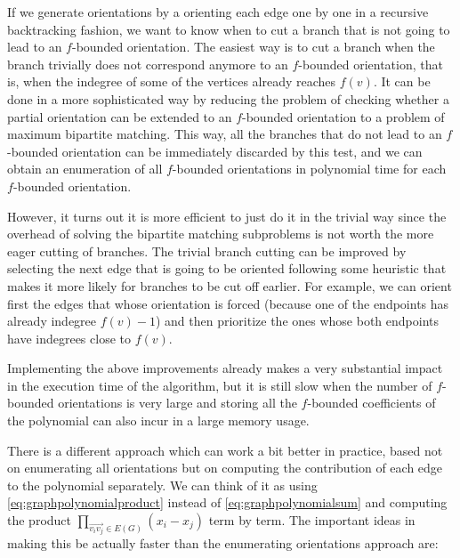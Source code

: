 If we generate orientations by a orienting each edge one by
one in a recursive backtracking fashion, we want to know when to cut a branch that is not going to lead
to an $f$-bounded orientation. The easiest way is to cut a branch when the 
branch trivially does not correspond
anymore to an $f$-bounded orientation, that is, 
when the indegree of some of the vertices already reaches $f(v)$. 
It can be done in a more sophisticated way by reducing the problem of checking whether a partial 
orientation can be extended to an $f$-bounded 
orientation to a problem of maximum bipartite matching. This way,
all the branches that do not lead to an $f$-bounded 
orientation can be immediately discarded by this test, and 
we can obtain an enumeration of all $f$-bounded orientations in polynomial time for each 
$f$-bounded orientation.

However, it turns out it is more efficient to just do it in the trivial way since the overhead of solving
the bipartite matching subproblems is not worth the more eager cutting of branches. The trivial branch cutting
can be improved by selecting the next edge that is going to be oriented following some heuristic
that makes it more likely for branches to be cut off earlier. 
For example, we can orient first the edges that whose orientation is forced 
(because one of the endpoints has already indegree $f(v)-1$) 
and then prioritize the ones whose both endpoints have indegrees close to $f(v)$.

Implementing the above improvements already makes a very substantial impact in the execution time
of the algorithm, but it is still slow when the number of $f$-bounded orientations is very large
and storing all the $f$-bounded coefficients of the polynomial can also incur in a large memory usage.

There is a different approach which can work a bit better in practice, based not on enumerating
all orientations but on computing the contribution of each edge to the polynomial separately. 
We can think of it as using \eqref{eq:graphpolynomialproduct} instead of \eqref{eq:graphpolynomialsum} and
computing the product $\prod_{\overrightarrow{v_iv_j} \in E(G)} (x_i - x_j)$ term by term.
The important ideas in making this be actually faster than the enumerating orientations approach are:

